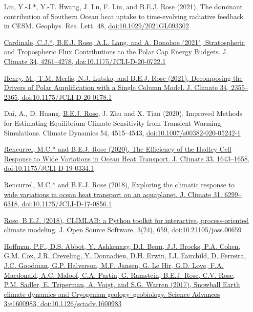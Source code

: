 \documentclass[11pt, letterpaper]{article} %
\newcommand{\years}[1]{\marginnote{\scriptsize #1}} %
\newcommand{\publink}{http://www.atmos.albany.edu/facstaff/brose/resources/Publications/}
\begin{document}
Lin, Y.-J.*, Y.-T. Hwang, J. Lu, F. Liu, and \underline{B.E.J. Rose} (2021), The dominant contribution of Southern Ocean heat uptake to time-evolving radiative feedback in CESM. Geophys. Res. Lett. 48, \href{https://doi.org/10.1029/2021GL093302}{doi:10.1029/2021GL093302}
\vspace{0.2 cm}

\href{\publink Cardinale_etal_JClim2021.pdf}{Cardinale, C.J.*, \underline{B.E.J. Rose}, A.L. Lang, and A. Donohoe (2021), Stratospheric and Tropospheric Flux Contributions to the Polar Cap Energy Budgets. J. Climate 34, 4261--4278, doi:10.1175/JCLI-D-20-0722.1}
\vspace{0.2 cm}

\href{\publink Henry_etal_JClim2021.pdf}{Henry, M., T.M. Merlis, N.J. Lutsko, and \underline{B.E.J. Rose} (2021), Decomposing the Drivers of Polar Amplification with a Single Column Model. J. Climate 34, 2355--2365, doi:10.1175/JCLI-D-20-0178.1}
\vspace{0.2 cm}

\years{2020} 
Dai, A., D. Huang, \underline{B.E.J. Rose}, J. Zhu and X. Tian (2020), Improved Methods for Estimating Equilibrium Climate Sensitivity from Transient Warming Simulations. Climate Dynamics 54, 4515--4543, \href{https://doi.org/10.1007/s00382-020-05242-1}{doi:10.1007/s00382-020-05242-1}
\vspace{0.2 cm}

\href{\publink Rencurrel_Rose_JClim2020.pdf}{Rencurrel, M.C.* and \underline{B.E.J. Rose} (2020), The Efficiency of the Hadley Cell Response to Wide Variations in Ocean Heat Transport. J. Climate 33, 1643--1658, doi:10.1175/JCLI-D-19-0334.1}
\vspace{0.2 cm}

\years{2018} 
\href{\publink Rencurrel_Rose_jcli-d-17-0856.1.pdf}{Rencurrel, M.C.* and \underline{B.E.J. Rose} (2018), Exploring the climatic response to wide variations in ocean heat transport on an aquaplanet. J. Climate 31, 6299--6318, doi:10.1175/JCLI-D-17-0856.1} 
\vspace{0.2 cm}

\href{\publink Rose_JOSS2018.pdf}{\underline{Rose, B.E.J.} (2018), CLIMLAB: a Python toolkit for interactive, process-oriented climate modeling. J. Open Source Software, 3(24), 659, doi:10.21105/joss.00659}
\vspace{0.2 cm}

\years{2017} 
\href{http://advances.sciencemag.org/content/3/11/e1600983}{Hoffman, P.F., D.S. Abbot, Y. Ashkenazy, D.I. Benn, J.J. Brocks, P.A. Cohen, G.M. Cox, J.R. Creveling, Y. Donnadieu, D.H. Erwin, I.J. Fairchild, D. Ferreira, J.C. Goodman, G.P. Halverson, M.F. Jansen, G. Le Hir, G.D. Love, F.A. Macdonald, A.C. Maloof, C.A. Partin, G. Ramstein, \underline{B.E.J. Rose}, C.V. Rose, P.M. Sadler, E. Tziperman, A. Voigt, and S.G. Warren (2017), Snowball Earth climate dynamics and Cryogenian geology--geobiology. Science Advances 3:e1600983, doi:10.1126/sciadv.1600983}
\vspace{0.2 cm}
\end{document}
